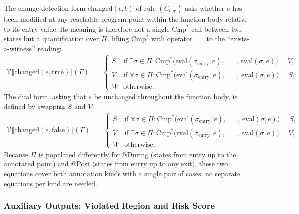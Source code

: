 \documentclass[pdflatex,sn-basic]{sn-jnl}%
\theoremstyle{thmstyleone}%
\theoremstyle{thmstyletwo}%
\theoremstyle{thmstylethree}%
\begin{document}
The change-detection form $\text{changed}(e, b)$ of rule $(C_{\text{chg}})$ asks whether $e$ has been modified at any reachable program point within the function body relative to its entry value.
Its meaning is therefore not a single $\text{Cmp}^*$ call between two states but a quantification over $\Pi$, lifting $\text{Cmp}^*$ with operator $=$ to the ``exists-a-witness'' reading:
\begin{align*}
\mathcal{V}\llbracket \text{changed}(e, \text{true}) \rrbracket(\Gamma) \;=\;
\begin{cases}
S & \text{if } \exists \sigma \in \Pi : \text{Cmp}^*\bigl(\text{eval}(\sigma_{\text{entry}}, e),\; =,\; \text{eval}(\sigma, e)\bigr) = V, \\[2pt]
V & \text{if } \forall \sigma \in \Pi : \text{Cmp}^*\bigl(\text{eval}(\sigma_{\text{entry}}, e),\; =,\; \text{eval}(\sigma, e)\bigr) = S, \\[2pt]
W & \text{otherwise.}
\end{cases}
\end{align*}
The dual form, asking that $e$ be unchanged throughout the function body, is defined by swapping $S$ and $V$:
\begin{align*}
\mathcal{V}\llbracket \text{changed}(e, \text{false}) \rrbracket(\Gamma) \;=\;
\begin{cases}
S & \text{if } \forall \sigma \in \Pi : \text{Cmp}^*\bigl(\text{eval}(\sigma_{\text{entry}}, e),\; =,\; \text{eval}(\sigma, e)\bigr) = S, \\[2pt]
V & \text{if } \exists \sigma \in \Pi : \text{Cmp}^*\bigl(\text{eval}(\sigma_{\text{entry}}, e),\; =,\; \text{eval}(\sigma, e)\bigr) = V, \\[2pt]
W & \text{otherwise.}
\end{cases}
\end{align*}
Because $\Pi$ is populated differently for @During (states from entry up to the annotated point) and @Post (states from entry up to any exit), these two equations cover both annotation kinds with a single pair of cases; no separate equations per kind are needed.

\subsubsection{Auxiliary Outputs: Violated Region and Risk Score}\label{sec:validation-engine}
\end{document}
